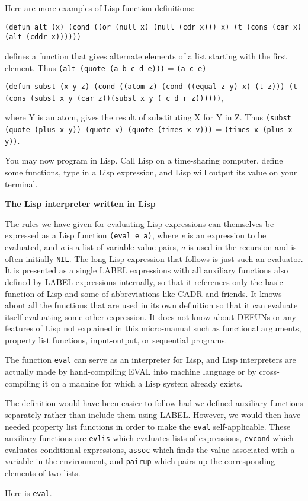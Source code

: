 \documentclass[8pt,letter,twocolumn]{article}
\begin{document}
Here are more examples of Lisp function definitions:

\texttt{(defun alt (x) (cond ((or (null x) (null (cdr x))) x) (t (cons (car x)
  (alt (cddr x))))))}

defines a function that gives alternate elements of a list starting with the
first element. Thus \texttt{(alt (quote (a b c d e)))} = \texttt{(a c e)}

\texttt{(defun subst (x y z) (cond ((atom z) (cond ((equal z y) x) (t z))) (t
  (cons (subst x y (car z))(subst x y ( c d r z))))))},

where Y is an atom, gives the result of substituting X for Y in Z. Thus
\texttt{(subst (quote (plus x y)) (quote v) (quote (times x v)))} =
\texttt{(times x (plus x y))}.

You may now program in Lisp. Call Lisp on a time-sharing computer, define some
functions, type in a Lisp expression, and Lisp will output its value on your
terminal.

\vspace*{1\baselineskip}
\textbf{The Lisp interpreter written in Lisp}
\vspace*{1\baselineskip}

The rules we have given for evaluating Lisp expressions can themselves be
expressed as a Lisp function \texttt{(eval e a)}, where \textit{e} is an
expression to be evaluated, and \textit{a} is a list of variable-value pairs,
\textit{a} is used in the recursion and is often initially \texttt{NIL}. The
long Lisp expression that follows is just such an evaluator. It is presented as
a single LABEL expressions with all auxiliary functions also defined by LABEL
expressions internally, so that it references only the basic function of Lisp
and some of abbreviations like CADR and friends. It knows about all the
functions that are used in its own definition so that it can evaluate itself
evaluating some other expression. It does not know about DEFUNs or any features
of Lisp not explained in this micro-manual such as functional arguments,
property list functions, input-output, or sequential programs.

The function \texttt{eval} can serve as an interpreter for Lisp, and Lisp
interpreters are actually made by hand-compiling EVAL into machine language or
by cross-compiling it on a machine for which a Lisp system already exists.

The definition would have been easier to follow had we defined auxiliary
functions separately rather than include them using LABEL. However, we would
then have needed property list functions in order to make the \texttt{eval}
self-applicable. These auxiliary functions are \texttt{evlis} which evaluates
lists of expressions, \texttt{evcond} which evaluates conditional expressions,
\texttt{assoc} which finds the value associated with a variable in the
environment, and \texttt{pairup} which pairs up the corresponding elements of
two lists.

\newpage
Here is \texttt{eval}.

\end{document}
